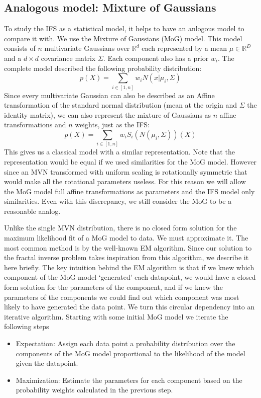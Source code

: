 \documentclass[11pt, twocolumn]{article}
\theoremstyle{definition}
\begin{document}
\subsection{Analogous model: Mixture of Gaussians}

To study the IFS as a statistical model, it helps to have an anlogous model to compare it with. We use the Mixture of Gaussians (MoG) model. This model consists of $n$ multivariate Gaussians over ${\mathbb R}^d$ each represented by a mean $\mu \in {\mathbb R}^D$ and a $d \times d$ covariance matrix $\Sigma$. Each component also has a prior $w_i$. The complete model described the following probability distribution:
\[
p(X) = \sum_{i \in [1,n]} w_i N(x|\mu_i, \Sigma)
\]
Since every multivariate Gaussian can also be described as an Affine transformation of the standard normal distribution (mean at the origin and $\Sigma$ the identity matrix), we can also represent the mixture of Gaussians as $n$ affine transformations and $n$ weights, just as the IFS:
\[
p(X) = \sum_{i \in [1,n]} w_i S_i(N(\mu_i, \Sigma))(X)
\]
This gives us a classical model with a similar representation. Note that the representation would be equal if we used similarities for the MoG model. However since an MVN transformed with uniform scaling is rotationally symmetric that would make all the rotational parameters useless. For this reason we will allow the MoG model full affine transformations as parameters and the IFS model only similarities. Even with this discrepancy, we still consider the MoG to be a reasonable analog.

Unlike the single MVN distribution, there is no closed form solution for the maximum likelihood fit of a MoG model to data. We must approximate it. The most common method is by the well-known EM algorithm. Since our solution to the fractal inverse problem takes inspiration from this algorithm, we describe it here briefly. The key intuition behind the EM algorithm is that if we knew which component of the MoG model `generated' each datapoint, we would have a closed form solution for the parameters of the component, and if we knew the parameters of the components we could find out which component was most likely to have generated the data point. We turn this circular dependency into an iterative algorithm. Starting with some initial MoG model we iterate the following steps

\begin{itemize}
  \item Expectation: Assign each data point a probability distribution over the components of the MoG model proportional to the likelihood of the model given the datapoint.
  \item Maximization: Estimate the parameters for each component based on the probability weights calculated in the previous step.  
\end{itemize} 
\end{document}
